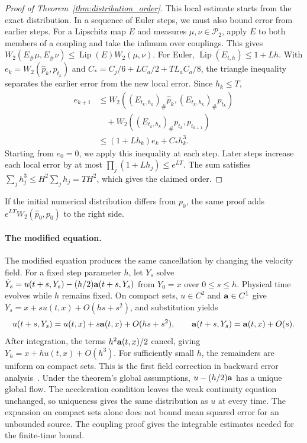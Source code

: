 \begin{proof}[Proof of Theorem~\ref{thm:distribution_order}]
This local estimate starts from the exact distribution. In a sequence of Euler steps, we must also bound error from earlier steps. For a Lipschitz map $E$ and measures $\mu,\nu\in\mathcal P_2$, apply $E$ to both members of a coupling and take the infimum over couplings. This gives $W_2(E_\#\mu,E_\#\nu)\le\operatorname{Lip}(E)W_2(\mu,\nu)$. For Euler, $\operatorname{Lip}(E_{t,h})\le1+Lh$. With $e_k=W_2(\widehat p_k,p_{t_k})$ and $C_*=C_j/6+LC_a/2+TL_aC_a/8$, the triangle inequality separates the earlier error from the new local error. Since $h_k\le T$,
\begin{align*}
 e_{k+1}&\le W_2((E_{t_k,h_k})_\#\widehat p_k,(E_{t_k,h_k})_\#p_{t_k})\\
 &\quad+W_2((E_{t_k,h_k})_\#p_{t_k},p_{t_{k+1}})\\
 &\le(1+Lh_k)e_k+C_*h_k^3.
\end{align*}
Starting from $e_0=0$, we apply this inequality at each step. Later steps increase each local error by at most $\prod_j(1+Lh_j)\le e^{LT}$. The sum satisfies $\sum_jh_j^3\le H^2\sum_jh_j=TH^2$, which gives the claimed order.
\end{proof}

If the initial numerical distribution differs from $p_0$, the same proof adds
$e^{LT}W_2(\widehat p_0,p_0)$ to the right side. 

\paragraph{The modified equation.}
The modified equation produces the same cancellation by changing the velocity field. For a fixed step parameter $h$, let $Y_s$ solve $\dot Y_s=u(t+s,Y_s)-(h/2)\mathbf a(t+s,Y_s)$ from $Y_0=x$ over $0\le s\le h$. Physical time evolves while $h$ remains fixed. On compact sets, $u\in C^2$ and $\mathbf a\in C^1$ give $Y_s=x+s u(t,x)+O(hs+s^2)$, and substitution yields
\[
 u(t+s,Y_s)=u(t,x)+s\mathbf a(t,x)+O(hs+s^2),\qquad
 \mathbf a(t+s,Y_s)=\mathbf a(t,x)+O(s).
\]
After integration, the terms $h^2\mathbf a(t,x)/2$ cancel, giving $Y_h=x+hu(t,x)+O(h^3)$. For sufficiently small $h$, the remainders are uniform on compact sets. This is the first field correction in backward error analysis~\citep[Chapter~IX]{hairer2006geometric}. Under the theorem's global assumptions, $u-(h/2)\mathbf a$ has a unique global flow. The acceleration condition leaves the weak continuity equation unchanged, so uniqueness gives the same distribution as $u$ at every time. The expansion on compact sets alone does not bound mean squared error for an unbounded source. The coupling proof gives the integrable estimates needed for the finite-time bound.

